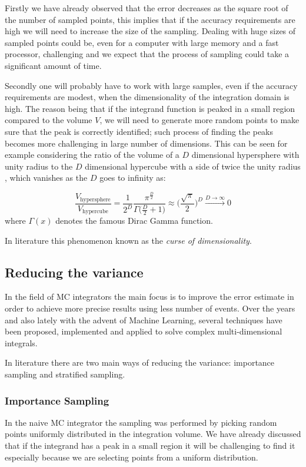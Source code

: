 \documentclass[../main/main.tex]{subfiles}
\begin{document}
Firstly we have already observed that the error decreases as the square root of the number of sampled points, 
this implies that if the accuracy requirements are high we will need to increase the size of the sampling. 
Dealing with huge sizes of sampled points could be, even for a computer with large memory and a fast processor, 
challenging and we expect that the process of sampling could take a significant amount of time.

Secondly one will probably have to work with large samples, even if the accuracy requirements are modest, when
the dimensionality of the integration domain is high. The reason being that if the integrand function is peaked in a small
region compared to the volume $V$, we will need to generate more random points to make sure that the peak is correctly 
identified; such process of finding the peaks becomes more challenging in large number of dimensions.
This can be seen for example considering the ratio of the volume of a $D$ dimensional hypersphere with unity radius to the $D$ dimensional hypercube with a side of twice the unity radius , which vanishes as the $D$ goes to infinity as:

\begin{equation}
	\frac{V_{\text{hypersphere}}}{V_{\text{hypercube} }} = \frac{1}{2^D} \frac{\pi^{\frac{D}{2}}}{\Gamma\big(\frac{D}{2} + 1\big)} \approx  \bigg( \frac{\sqrt{\pi}}{2} \bigg)^D \xrightarrow{D \rightarrow  \infty} 0
\end{equation}
where $\Gamma(x)$ denotes the famous Dirac Gamma function.

In literature this phenomenon known as the \emph{curse of dimensionality}.

\subsection{Reducing the variance}
\label{redu_var}
In the field of MC integrators the main focus is to improve the error estimate in order to achieve more precise results using less number of
events. Over the years and also lately with the advent of Machine Learning, several techniques have been proposed, implemented and applied to solve complex multi-dimensional integrals.

In literature there are two main ways of reducing the variance: importance sampling and stratified sampling.

\subsubsection{Importance Sampling}
In the naive MC integrator the sampling was performed by picking random points uniformly distributed in the integration volume. 
We have already discussed that if the integrand has a peak in a small region it will be challenging to find it especially because we are selecting points from a uniform distribution. 
\end{document}
